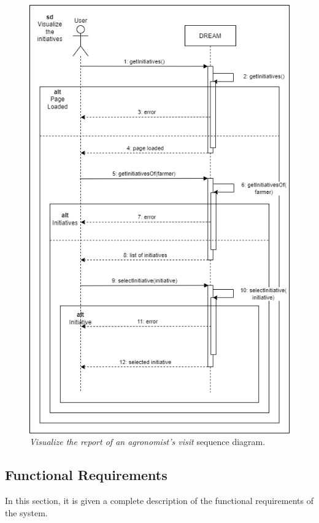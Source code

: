 \begin{figure}[H]
    \centering
    \includegraphics[height=1.5\linewidth]{Images/Use Case/UC19.png}
    \caption{\textit{Visualize the report of an agronomist’s visit} sequence diagram.}
\end{figure}
\newpage

\subsection{Functional Requirements}
In this section, it is given a complete description of the functional requirements of the system.

